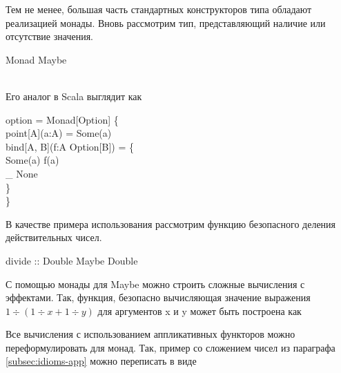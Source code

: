 Тем не менее, большая часть стандартных конструкторов типа обладают реализацией монады. Вновь рассмотрим тип, представляющий наличие или отсутствие значения.

\begin{haskell}
 Monad Maybe \\
\\
\quad{}
\end{haskell}

Его аналог в Scala выглядит как

\begin{haskell}
 option =  Monad[Option] \{ \\
\quad{} point[A](a:A) = Some(a)\\
\quad{} bind[A, B](f:A \Rightarrow Option[B]) = \{\\
\quad\quad\quad{} Some(a) \Rightarrow f(a)\\
\quad\quad\quad{} \_ \Rightarrow None\\
\quad\quad\}\\
\}
\end{haskell}

В качестве примера использования рассмотрим функцию безопасного деления действительных чисел.

\begin{haskell}
divide :: Double \to Maybe Double \\
\end{haskell}

С помощью монады для \<Maybe\> можно строить сложные вычисления с эффектами. Так, функция, безопасно вычисляющая значение выражения $1 \div (1 \div x + 1 \div y)$ для аргументов \<x\> и \<y\> может быть построена как

\begin{haskell}
\end{haskell}

Все вычисления с использованием аппликативных функторов можно переформулировать для монад. Так, пример со сложением чисел из параграфа \ref{subsec:idioms-app} можно переписать в виде

